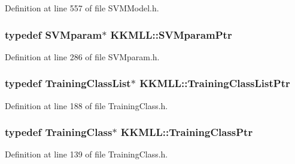 Definition at line 557 of file S\+V\+M\+Model.\+h.

\subsubsection[{\texorpdfstring{S\+V\+Mparam\+Ptr}{SVMparamPtr}}]{\setlength{\rightskip}{0pt plus 5cm}typedef {\bf S\+V\+Mparam}$\ast$ {\bf K\+K\+M\+L\+L\+::\+S\+V\+Mparam\+Ptr}}\hypertarget{namespace_k_k_m_l_l_a54fe1e609c2f04a7f05181a535bf4f92}{}\label{namespace_k_k_m_l_l_a54fe1e609c2f04a7f05181a535bf4f92}


Definition at line 286 of file S\+V\+Mparam.\+h.

\subsubsection[{\texorpdfstring{Training\+Class\+List\+Ptr}{TrainingClassListPtr}}]{\setlength{\rightskip}{0pt plus 5cm}typedef {\bf Training\+Class\+List}$\ast$ {\bf K\+K\+M\+L\+L\+::\+Training\+Class\+List\+Ptr}}\hypertarget{namespace_k_k_m_l_l_a21446a7d0151cdc0e5401d0ca6b269bc}{}\label{namespace_k_k_m_l_l_a21446a7d0151cdc0e5401d0ca6b269bc}


Definition at line 188 of file Training\+Class.\+h.

\subsubsection[{\texorpdfstring{Training\+Class\+Ptr}{TrainingClassPtr}}]{\setlength{\rightskip}{0pt plus 5cm}typedef {\bf Training\+Class}$\ast$ {\bf K\+K\+M\+L\+L\+::\+Training\+Class\+Ptr}}\hypertarget{namespace_k_k_m_l_l_aee99044bdeeb0a43cdc845c2c01b1c14}{}\label{namespace_k_k_m_l_l_aee99044bdeeb0a43cdc845c2c01b1c14}


Definition at line 139 of file Training\+Class.\+h.

